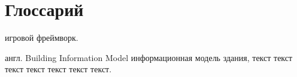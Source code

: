 ﻿
\section*{Глоссарий}

\begin{rglossary}
    {игровой фреймворк.}

    {англ. Building Information Model}
    {информационная модель здания, текст {} текст текст текст текст текст текст.}
\end{rglossary}